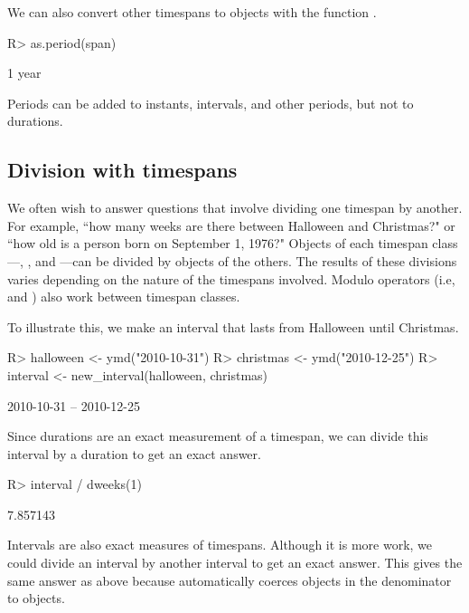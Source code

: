 \documentclass[article]{jss}
\begin{document}
We can also convert other timespans to  objects with the function .

\begin{CodeInput}
R> as.period(span)
\end{CodeInput}
\begin{CodeOutput}
[1] 1 year
\end{CodeOutput}

Periods can be added to instants, intervals, and other periods, but not to durations.


\subsection{Division with timespans}

We often wish to answer questions that involve dividing one timespan by another. For example, ``how many weeks are there between Halloween and Christmas?" or ``how old is a person born on September 1, 1976?" Objects of each timespan class---, , and ---can be divided by objects of the others. The results of these divisions varies depending on the nature of the timespans involved. Modulo operators (i.e, \code{\%\%} and \code{\%/\%}) also work between timespan classes.

To illustrate this, we make an interval that lasts from Halloween until Christmas.

\begin{CodeInput}
R> halloween <- ymd("2010-10-31")
R> christmas <- ymd("2010-12-25")
R> interval <- new_interval(halloween, christmas)
\end{CodeInput}
\begin{CodeOutput}
[1] 2010-10-31 -- 2010-12-25
\end{CodeOutput}

Since durations are an exact measurement of a timespan, we can divide this interval by a duration to get an exact answer.

\begin{CodeInput}
R> interval / dweeks(1)
\end{CodeInput}
\begin{CodeOutput}
[1] 7.857143
\end{CodeOutput}

Intervals are also exact measures of timespans. Although it is more work, we could divide an interval by another interval to get an exact answer. This gives the same answer as above because  automatically coerces  objects in the denominator to  objects.
\end{document}
